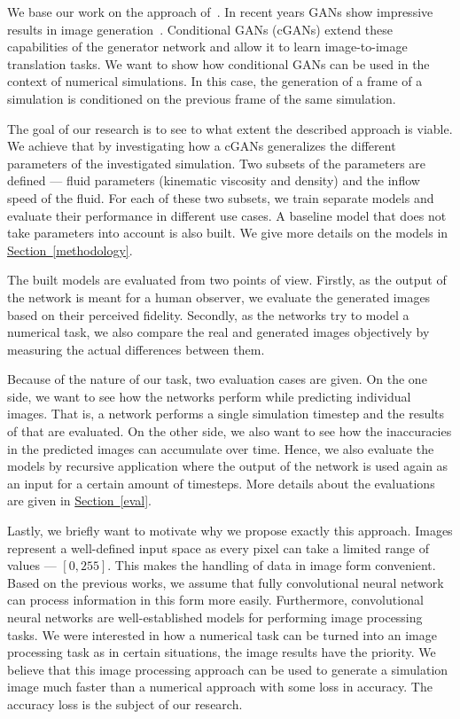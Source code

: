 \documentclass{llncs}
\newcommand{\refsec}[1]{\hyperref[#1]{Section~\ref*{#1}}}
\begin{document}
We base our work on the approach of~\cite{pix2pix}. In recent years GANs show impressive results in image generation~\cite{DashGALA17,ZhangXLZHWM16,karras2017progressive}. Conditional GANs (cGANs) extend these capabilities of the generator network and allow it to learn image-to-image translation tasks. We want to show how conditional GANs can be used in the context of numerical simulations. In this case, the generation of a frame of a simulation is conditioned on the previous frame of the same simulation.

The goal of our research is to see to what extent the described approach is viable. We achieve that by investigating how a cGANs generalizes the different parameters of the investigated simulation. Two subsets of the parameters are defined --- fluid parameters (kinematic viscosity and density) and the inflow speed of the fluid. For each of these two subsets, we train separate models and evaluate their performance in different use cases. A baseline model that does not take parameters into account is also built. We give more details on the models in \refsec{methodology}.

The built models are evaluated from two points of view. Firstly, as the output of the network is meant for a human observer, we evaluate the generated images based on their perceived fidelity. Secondly, as the networks try to model a numerical task, we also compare the real and generated images objectively by measuring the actual differences between them.

Because of the nature of our task, two evaluation cases are given. On the one side, we want to see how the networks perform while predicting individual images. That is, a network performs a single simulation timestep and the results of that are evaluated. On the other side, we also want to see how the inaccuracies in the predicted images can accumulate over time. Hence, we also evaluate the models by recursive application where the output of the network is used again as an input for a certain amount of timesteps. More details about the evaluations are given in \refsec{eval}.

Lastly, we briefly want to motivate why we propose exactly this approach. Images represent a well-defined input space as every pixel can take a limited range of values --- $[0, 255]$. This makes the handling of data in image form convenient. Based on the previous works, we assume that fully convolutional neural network can process information in this form more easily. Furthermore, convolutional neural networks are well-established models for performing image processing tasks. We were interested in how a numerical task can be turned into an image processing task as in certain situations, the image results have the priority.
We believe that this image processing approach can be used to generate a simulation image much faster than a numerical approach with some loss in accuracy. The accuracy loss is the subject of our research.
\end{document}
